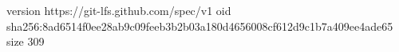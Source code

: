 version https://git-lfs.github.com/spec/v1
oid sha256:8ad6514f0ee28ab9c09feeb3b2b03a180d4656008cf612d9c1b7a409ee4ade65
size 309
